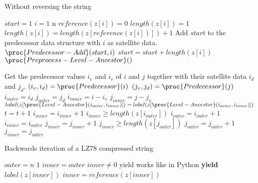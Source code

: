 \begin{algorithm}
\caption{Without reversing the string\label{alg:lz-forward}}
\begin{codebox}
\li $start = 1$
\li \For $i = 1$ \To n
    \Indentmore
\li     \If $reference(z[i]) = 0$
        \Indentmore
\li         $length(z[i]) = 1$
\li     \Else
\li         $length(z[i]) = length(z[reference(z[i])]) + 1$
        \End
\zi     \Comment Add $start$ to the predecessor data structure with $i$ as satellite data.
\li     $\proc{Predecessor-Add}(start, i)$
\li     $start = start + length(z[i])$
    \End
\li $\proc{Preprocess-Level-Ancestor}()$
\end{codebox}

\begin{codebox}
\zi \Comment Get the predecessor values $i_v$ and $i_v$ of $i$ and $j$ together with their satellite data $i_d$ and $j_d$.
\li $(i_v, i_d) = \proc{Predecessor}(i)$
\li $(j_v, j_d) = \proc{Predecessor}(j)$
\li $i_{outer} = i_d$
\li $j_{outer} = j_d$
\li $i_{inner} = i - i_v$
\li $j_{inner} = j - j_v$
\li \While $label(z[\proc{Level-Ancestor}(i_{outer}, i_{inner})]) = label(z[\proc{Level-Ancestor}(i_{outer}, i_{inner})])$
    \Indentmore
\li     $t = t + 1$
\li     $i_{inner} = i_{inner} + 1$
\li     \If $i_{inner} \geq length(z[i_{outer}])$
        \Indentmore
\li         $i_{outer} = i_{outer} + 1$
\li         $i_{inner} = i_{outer}$
        \End
\li     $j_{inner} = j_{inner} + 1$
\li     \If $j_{inner} \geq length(z[j_{outer}])$
        \Indentmore
\li         $j_{outer} = j_{outer} + 1$
\li         $j_{inner} = j_{outer}$
        \End
    \End
\end{codebox}
\end{algorithm}

\begin{algorithm}
\caption{Backwards iteration of a LZ78 compressed string\label{alg:lz-rev-iter}}
\begin{codebox}
\li \For $outer = n$ \Downto $1$
    \Indentmore
\li     $inner = outer$
\li     \While $inner \neq 0$
        \Indentmore
\zi         \Comment yield works like in Python
\li         \textbf{yield} $label(z[inner])$
\li         $inner = reference(z[inner])$
        \End
    \End
\end{codebox}
\end{algorithm}

